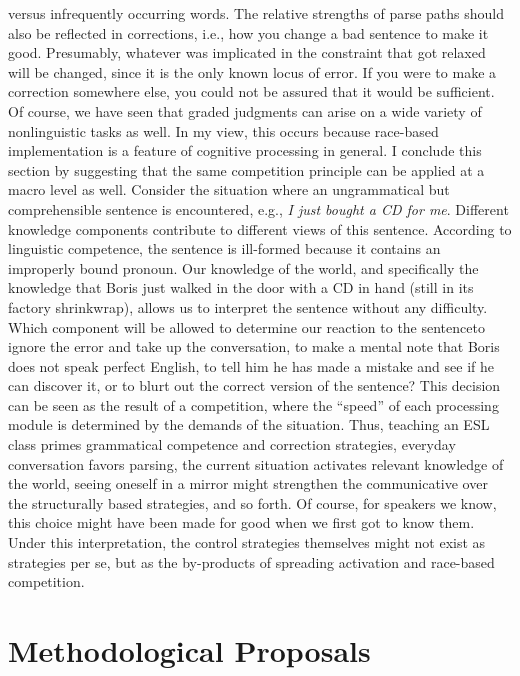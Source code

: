  versus infrequently occurring words. The relative strengths of parse paths should also be reflected in corrections, i.e., how you change a bad sentence to make it good. Presumably, whatever was implicated in the constraint that got relaxed will be changed, since it is the only known locus of error. If you were to make a correction somewhere else, you could not be assured that it would be sufficient. Of course, we have seen that graded judgments can arise on a wide variety of nonlinguistic tasks as well. In my view, this occurs because race-based implementation is a feature of cognitive processing in general. I conclude this section by suggesting that the same competition principle can be applied at a macro level as well. Consider the situation where an ungrammatical but comprehensible sentence is encountered, e.g., \textit{I just bought a CD for me}. Different knowledge components contribute to different views of this sentence. According to linguistic competence, the sentence is ill-formed  because it contains an improperly bound pronoun. Our knowledge of the world, and specifically the knowledge that Boris just walked in the door with a CD in hand (still in its factory shrinkwrap), allows us to interpret the sentence without any difficulty. Which component will be allowed to determine our reaction to the sentence\schdash{}to ignore the error and take up the conversation, to make a mental note that Boris does not speak perfect English, to tell him he has made a mistake and see if he can discover it, or to blurt out the correct version of the sentence? This decision can be seen as the result of a competition, where the ``speed'' of each processing module is determined by the demands of the situation. Thus, teaching an ESL class primes grammatical competence and correction strategies, everyday conversation favors parsing, the current situation activates relevant knowledge of the world, seeing oneself in a mirror might strengthen the communicative over the structurally based strategies, and so forth. Of course, for speakers we know, this choice might have been made for good when we first got to know them. Under this interpretation, the control strategies themselves might not exist as strategies per se, but as the by-products of spreading activation and race-based competition.

 \section{Methodological Proposals}\label{sec:6.3}

